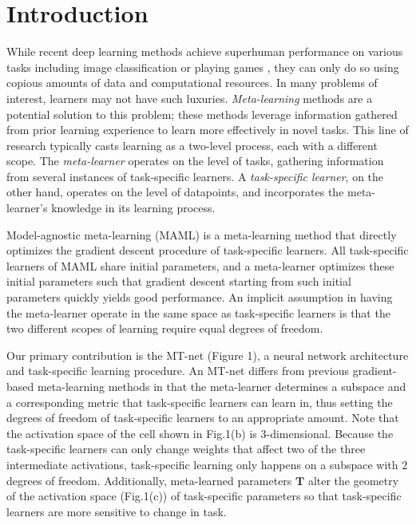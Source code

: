 \documentclass{article}
\newcommand{\0}{{\bf 0}}
\newcommand{\T}{\mathbf{T}}
\begin{document}
\section{Introduction}
\label{sec:introduction}

While recent deep learning methods achieve superhuman performance on various tasks including image classification 
\cite{Krizhevsky2012nips} or playing games \cite{MnihV2015nature}, they can only do so using copious amounts of data and computational resources.
In many problems of interest, learners may not have such luxuries.
\textit{Meta-learning} \cite{SchmidhuberJ87phd,SchmidhuberJ97mlj,ThrunS98book} methods are a potential solution to this problem; 
these methods leverage information gathered from prior learning experience to learn more effectively in novel tasks.
This line of research typically casts learning as a two-level process, each with a different scope.
The \emph{meta-learner} operates on the level of tasks, gathering information from several instances of task-specific learners.
A \emph{task-specific learner}, on the other hand, operates on the level of datapoints, and incorporates the meta-learner's knowledge in its learning process.

Model-agnostic meta-learning (MAML) \cite{FinnC2017icml} is a meta-learning method that directly optimizes the gradient descent procedure of task-specific learners.
All task-specific learners of MAML share initial parameters, and a meta-learner optimizes these initial parameters such that gradient descent 
starting from such initial parameters quickly yields good performance.
An implicit assumption in having the meta-learner operate in the same space as task-specific learners is that the two different scopes of learning
require equal degrees of freedom.

Our primary contribution is the MT-net (Figure 1), a neural network architecture and task-specific learning procedure.
An MT-net differs from previous gradient-based meta-learning methods in that the meta-learner determines a subspace and a corresponding metric 
that task-specific learners can learn in, thus setting the degrees of freedom of task-specific learners to an appropriate amount.
Note that the activation space of the cell shown in Fig.1(b) is $3$-dimensional.
Because the task-specific learners can only change weights that affect two of the three intermediate activations, 
task-specific learning only happens on a subspace with $2$ degrees of freedom.
Additionally, meta-learned parameters $\T$ alter the geometry of the activation space (Fig.1(c)) of task-specific parameters
so that task-specific learners are more sensitive to change in task.
\end{document}
